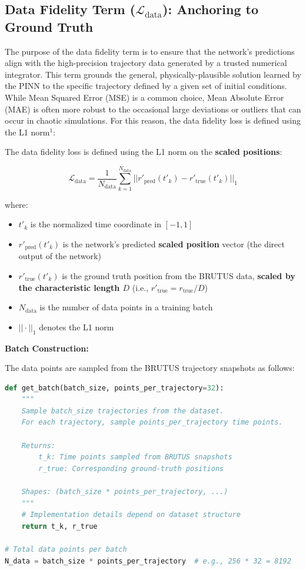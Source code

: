 \subsection[Data Fidelity Term: Anchoring to Ground Truth]{Data Fidelity Term ($\mathcal{L}_{\text{data}}$): Anchoring to Ground Truth}

The purpose of the data fidelity term is to ensure that the network's predictions align with the high-precision trajectory data generated by a trusted numerical integrator. This term grounds the general, physically-plausible solution learned by the PINN to the specific trajectory defined by a given set of initial conditions. While Mean Squared Error (MSE) is a common choice, Mean Absolute Error (MAE) is often more robust to the occasional large deviations or outliers that can occur in chaotic simulations. For this reason, the data fidelity loss is defined using the L1 norm$^1$:



The data fidelity loss is defined using the L1 norm on the \textbf{scaled positions}:

\[
\mathcal{L}_{\text{data}} = \frac{1}{N_{\text{data}}} \sum_{k=1}^{N_{\text{data}}} ||r'_{\text{pred}}(t'_k) - r'_{\text{true}}(t'_k)||_1
\]

where:
\begin{itemize}
    \item $t'_k$ is the normalized time coordinate in $[-1, 1]$
    \item $r'_{\text{pred}}(t'_k)$ is the network's predicted \textbf{scaled position} vector (the direct output of the network)
    \item $r'_{\text{true}}(t'_k)$ is the ground truth position from the BRUTUS data, \textbf{scaled by the characteristic length $D$} (i.e., $r'_{\text{true}} = r_{\text{true}}/D$)
    \item $N_{\text{data}}$ is the number of data points in a training batch
    \item $|| \cdot ||_1$ denotes the L1 norm
\end{itemize}





\textbf{Batch Construction:}

The data points are sampled from the BRUTUS trajectory snapshots as follows:

\begin{lstlisting}[language=Python, caption={Data Batch Construction}]
def get_batch(batch_size, points_per_trajectory=32):
    """
    Sample batch_size trajectories from the dataset.
    For each trajectory, sample points_per_trajectory time points.

    Returns:
        t_k: Time points sampled from BRUTUS snapshots
        r_true: Corresponding ground-truth positions

    Shapes: (batch_size * points_per_trajectory, ...)
    """
    # Implementation details depend on dataset structure
    return t_k, r_true

# Total data points per batch
N_data = batch_size * points_per_trajectory  # e.g., 256 * 32 = 8192
\end{lstlisting}

